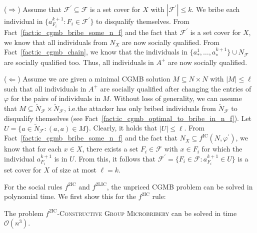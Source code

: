 \documentclass[
    12pt,               %
    a4paper,            %
    bibtotoc,           %
    pointlessnumbers,   %
    ngerman,            %
    titlepage,          %
    leqno,              %
    ]{scrarticle}       %
\newcommand\factref{Fact~\ref}
\begin{document}
\begin{Proof}
($\Rightarrow$) Assume that $\mathcal{F}^\prime \subseteq \mathcal{F}$ is a set cover for $X$ with $|\mathcal{F}^\prime| \leq k$. We bribe each individual in $\{ a^{k+1}_{F_i} : {F_i} \in \mathcal{F}^\prime \}$ to disqualify themselves. From \factref{fact:ic_cgmb_bribe_some_n_f} and the fact that $\mathcal{F}^\prime$ is a set cover for $X$, we know that all individuals from $N_X$ are now socially qualified. From \factref{fact:ic_cgmb_chain}, we know that the individuals in $\{ a^1_\ast, \ldots, a^{k+1}_\ast \} \cup N_\mathcal{F}$ are socially qualified too. Thus, all individuals in $A^+$ are now socially qualified.

($\Leftarrow$) Assume we are given a minimal CGMB solution $M \subseteq N \times N$ with $|M| \leq \ell$ such that all individuals in $A^+$ are socially qualified after changing the entries of $\varphi$ for the pairs of individuals in $M$. Without loss of generality, we can assume that $M \subseteq \tilde{N}_\mathcal{F} \times \tilde{N}_\mathcal{F}$, i.e.\@ the attacker has only bribed individuals from $\tilde{N}_\mathcal{F}$ to disqualify themselves (see \factref{fact:ic_cgmb_optimal_to_bribe_in_n_f}). Let $U = \{ a \in \tilde{N}_\mathcal{F} : (a, a) \in M \}$. Clearly, it holds that $|U| \leq \ell$. From \factref{fact:ic_cgmb_bribe_some_n_f} and the fact that $N_X \subseteq f^{\text{IC}}(N, \varphi^\prime)$, we know that for each $x \in X$, there exists a set $F_i \in \mathcal{F}$ with $x \in F_i$ for which the individual $a^{k+1}_{F_i}$ is in $U$. From this, it follows that $\mathcal{F}^\prime = \{ F_i \in \mathcal{F} : a^{k+1}_{F_i} \in U \}$ is a set cover for $X$ of size at most $\ell = k$.
\end{Proof}



For the social rules $f^{\text{2IC}}$ and $f^{\text{2LIC}}$, the unpriced CGMB problem can be solved in polynomial time. We first show this for the $f^{\text{2IC}}$ rule:

\begin{Theorem} \label{thm:2ic_cgmb_p}
The problem $f^{\text{2IC}}$-\textsc{Constructive Group Microbribery} can be solved in time $\mathcal{O}(n^3)$.
\end{Theorem}
\end{document}
